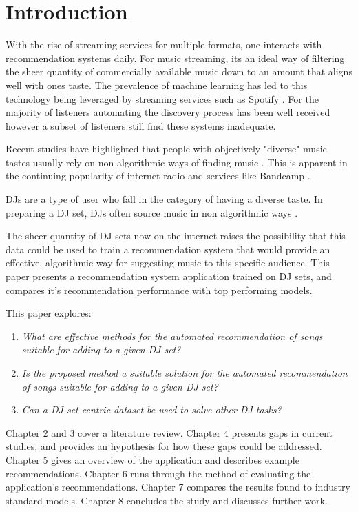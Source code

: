 
\graphicspath{{Chapter1/}}


\chapter{Introduction}
With the rise of streaming services for multiple formats, one interacts with recommendation systems daily. For music streaming, its an ideal way of filtering the sheer quantity of commercially available music down to an amount that aligns well with ones taste. The prevalence of machine learning has led to this technology being leveraged by streaming services such as Spotify \citep{httpsresearchatspotifycommachine-learning_machine_2023}. For the majority of listeners automating the discovery process has been well received however a subset of listeners still find these systems inadequate.

Recent studies have highlighted that people with objectively "diverse" music tastes usually rely on non algorithmic ways of finding music \citep{anderson_algorithmic_2020}. This is apparent in the continuing popularity of internet radio and services like Bandcamp \citep{market_research_future_internet_2022} \citep{roberts_anti-spotify_2020}. 

DJs are a type of user who fall in the category of having a diverse taste. In preparing a DJ set, DJs often source music in non algorithmic ways \citep{allen_djs_2021}.

 The sheer quantity of DJ sets now on the internet raises the possibility that this data could be used to train a recommendation system that would provide an effective, algorithmic way for suggesting music to this specific audience. This paper presents a recommendation system application trained on DJ sets, and compares it's recommendation performance with top performing models.

This paper explores:

\begin{enumerate}
	\item \textit{What are effective methods for the automated recommendation of songs suitable for adding to a given DJ set?}
	\item \textit{Is the proposed method a suitable solution for the automated recommendation of songs suitable for adding to a given DJ set?}
	\item \textit{Can a DJ-set centric dataset be used to solve other DJ tasks?}
\end{enumerate}

Chapter 2 and 3 cover a literature review. Chapter 4 presents gaps in current studies, and provides an hypothesis for how these gaps could be addressed. Chapter 5 gives an overview of the application and describes example recommendations. Chapter 6 runs through the method of evaluating the application's recommendations. Chapter 7 compares the results found to industry standard models. Chapter 8 concludes the study and discusses further work.
 